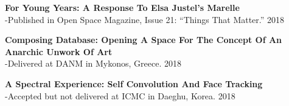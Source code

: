 \textbf{For Young Years: A Response To Elsa Justel's Marelle}\\
-Published in Open Space Magazine, Issue 21: ``Things That Matter.'' 2018

\textbf{Composing Database: Opening A Space For The Concept Of An Anarchic Unwork Of Art}\\
-Delivered at DANM in Mykonos, Greece. 2018

\textbf{A Spectral Experience: Self Convolution And Face Tracking}\\
-Accepted but not delivered at ICMC in Daeghu, Korea. 2018
